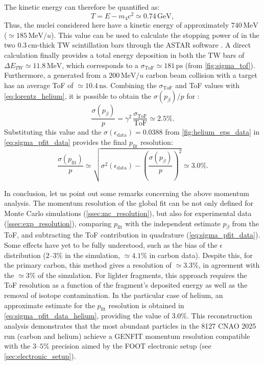 The kinetic energy can therefore be quantified as:
\begin{equation}
	T=E-m_{4}c^2\simeq 0.74\,\mathrm{GeV},
	\label{eq:total_h4_kin_energy}
\end{equation}
Thus, the  nuclei considered here have a kinetic energy of approximately $740\,\mathrm{MeV}$ ($\simeq185\,\mathrm{MeV}/u$). This value can be used to calculate the stopping power of  in the two $0.3\,\mathrm{cm}$-thick TW scintillation bars through the ASTAR software \cite{Berger2017ASTAR}. A direct calculation finally provides a total energy deposition in both the TW bars of $\Delta E_{TW}\simeq11.8\,\mathrm{MeV}$, which corresponds to a $\sigma_{\text{ToF}}\simeq181\,\mathrm{ps}$ (from \autoref{fig:sigma_tof}). Furthermore, a  generated from a $200\,\mathrm{MeV}/u$ carbon beam collision with a  target has an average ToF of $\simeq10.4\,\mathrm{ns}$. Combining the $\sigma_{\text{ToF}}$ and ToF values with \autoref{eq:lorentz_helium}, it is possible to obtain the $\sigma(p_\beta)/p$ for :
\begin{equation}
	\frac{\sigma(p_\beta)}{p}
	=
	\gamma^2\,\frac{\sigma_\mathrm{ToF}}{\mathrm{ToF}}
	\simeq 2.5\%.
	\label{eq:sigma_pbeta_data_helium}
\end{equation}
Substituting this value and the $\sigma(\epsilon_\text{data})=0.0388$ from \autoref{fig:helium_eps_data} in \autoref{eq:sigma_pfit_data} provides the final $p_\text{fit}$ resolution:
\begin{equation}
	\frac{\sigma(p_\text{fit})}{p}\simeq\sqrt{\sigma^2(\epsilon_\text{data})-\left(\frac{\sigma(p_\beta)}{p}\right)^2}\simeq3.0\%.
	\label{eq:sigma_pfit_data_helium}
\end{equation}

In conclusion, let us point out some remarks concerning the above momentum analysis. The momentum resolution of the global fit can be not only defined for Monte Carlo simulations (\autoref{ssec:mc_resolution}), but also for experimental data (\autoref{ssec:exp_resolution}), comparing $p_\text{fit}$ with the independent estimate $p_\beta$ from the ToF, and subtracting the ToF contribution in quadrature (\autoref{eq:sigma_pfit_data}). Some effects have yet to be fully understood, such as the bias of the $\epsilon$ distribution ($2$--$3\%$ in the simulation, $\simeq4.1\%$ in carbon data). Despite this, for the primary carbon, this method gives a resolution of $\simeq3.3\%$, in agreement with the $\simeq3\%$ of the simulation. For lighter fragments, this approach requires the ToF resolution as a function of the fragment's deposited energy as well as the removal of isotope contamination. In the particular case of helium, an approximate estimate for the  $p_\text{fit}$ resolution is obtained in \autoref{eq:sigma_pfit_data_helium}, providing the value of $3.0\%$. This reconstruction analysis demonstrates that the most abundant particles in the 8127 CNAO 2025 run (carbon and helium) achieve a GENFIT momentum resolution compatible with the $3$--$5\%$ precision aimed by the FOOT electronic setup (see \autoref{sec:electronic_setup}).